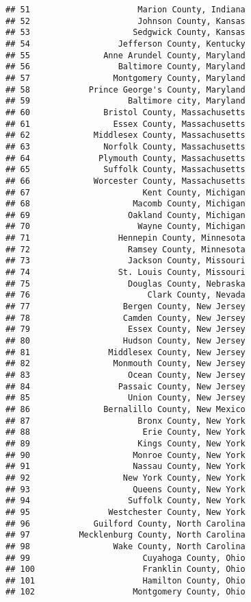 \documentclass[
]{article}
\begin{document}
\begin{verbatim}
## 51                      Marion County, Indiana
## 52                      Johnson County, Kansas
## 53                     Sedgwick County, Kansas
## 54                  Jefferson County, Kentucky
## 55               Anne Arundel County, Maryland
## 56                  Baltimore County, Maryland
## 57                 Montgomery County, Maryland
## 58            Prince George's County, Maryland
## 59                    Baltimore city, Maryland
## 60               Bristol County, Massachusetts
## 61                 Essex County, Massachusetts
## 62             Middlesex County, Massachusetts
## 63               Norfolk County, Massachusetts
## 64              Plymouth County, Massachusetts
## 65               Suffolk County, Massachusetts
## 66             Worcester County, Massachusetts
## 67                       Kent County, Michigan
## 68                     Macomb County, Michigan
## 69                    Oakland County, Michigan
## 70                      Wayne County, Michigan
## 71                  Hennepin County, Minnesota
## 72                    Ramsey County, Minnesota
## 73                    Jackson County, Missouri
## 74                  St. Louis County, Missouri
## 75                    Douglas County, Nebraska
## 76                        Clark County, Nevada
## 77                   Bergen County, New Jersey
## 78                   Camden County, New Jersey
## 79                    Essex County, New Jersey
## 80                   Hudson County, New Jersey
## 81                Middlesex County, New Jersey
## 82                 Monmouth County, New Jersey
## 83                    Ocean County, New Jersey
## 84                  Passaic County, New Jersey
## 85                    Union County, New Jersey
## 86               Bernalillo County, New Mexico
## 87                      Bronx County, New York
## 88                       Erie County, New York
## 89                      Kings County, New York
## 90                     Monroe County, New York
## 91                     Nassau County, New York
## 92                   New York County, New York
## 93                     Queens County, New York
## 94                    Suffolk County, New York
## 95                Westchester County, New York
## 96             Guilford County, North Carolina
## 97          Mecklenburg County, North Carolina
## 98                 Wake County, North Carolina
## 99                       Cuyahoga County, Ohio
## 100                      Franklin County, Ohio
## 101                      Hamilton County, Ohio
## 102                    Montgomery County, Ohio

\end{verbatim}
\end{document}
